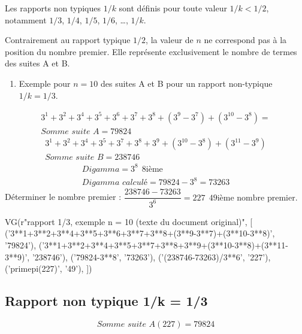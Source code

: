 \documentclass[11pt,a4paper]{article}
\begin{document}
Les rapports non typiques $1/k$ sont définis pour toute valeur $1/k < 1/2$,
notamment $1/3$, $1/4$, $1/5$, $1/6$, \dots, $1/k$.

Contrairement au rapport typique $1/2$, la valeur de $n$ ne correspond pas à la position du nombre premier. Elle représente exclusivement le nombre de termes des suites A et B.

\begin{enumerate}[label=\arabic*.,start=3,leftmargin=*]
\item Exemple pour $n=10$ des suites A et B pour un rapport non-typique $1/k=1/3$.
\end{enumerate}
\begin{gather*}
3^{1}+3^{2}+3^{4}+3^{5}+3^{6}+3^{7}+3^{8}+(3^{9}-3^{7})+(3^{10}-3^{8})=\\
\textit{Somme suite A}=79824
\end{gather*}
\begin{gather*}
3^{1}+3^{2}+3^{4}+3^{5}+3^{7}+3^{8}+3^{9}+(3^{10}-3^{8})+(3^{11}-3^{9})\\
\textit{Somme suite B}=238746
\end{gather*}
\begin{gather*}
\textit{Digamma}=3^{8}\ \ 8\text{ième}\\
\textit{Digamma calculé}=79824-3^{8}=73263
\end{gather*}
Déterminer le nombre premier : $\dfrac{238746-73263}{3^{6}}=227\ \ 49\text{ième nombre premier.}$

\begin{pycode}
VG(r"rapport 1/3, exemple n = 10 (texte du document original)", [
  ('3**1+3**2+3**4+3**5+3**6+3**7+3**8+(3**9-3**7)+(3**10-3**8)', '79824'),
  ('3**1+3**2+3**4+3**5+3**7+3**8+3**9+(3**10-3**8)+(3**11-3**9)', '238746'),
  ('79824-3**8', '73263'),
  ('(238746-73263)/3**6', '227'),
  ('primepi(227)', '49'),
])
\end{pycode}


\subsection{Rapport non typique 1/k = 1/3}
\[
\textit{Somme suite A}(227)=79824
\]
\end{document}
